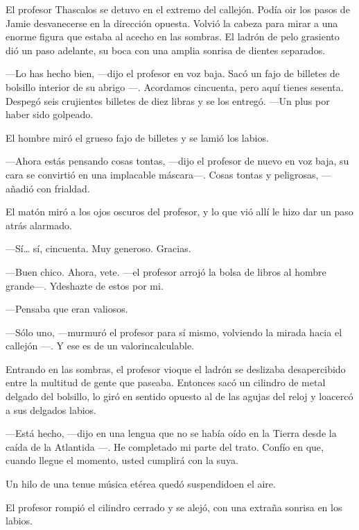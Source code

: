El profesor Thascalos se detuvo en el extremo del callejón.
Podía oir los pasos de Jamie desvanecerse en la dirección opuesta.
Volvió la cabeza para mirar a una enorme figura que estaba al acecho en
las sombras. El ladrón de pelo grasiento dió un paso adelante, su boca
con una amplia sonrisa de dientes separados.

---Lo has hecho bien, ---dijo el profesor en voz baja. Sacó un
fajo de billetes de bolsillo interior de su abrigo ---. Acordamos
cincuenta, pero aquí tienes sesenta. Despegó seis crujientes billetes de
diez libras y se los entregó. ---Un plus por haber sido golpeado.

El hombre miró el grueso fajo de billetes y se lamió los labios.

---Ahora estás pensando cosas tontas, ---dijo el profesor de
nuevo en voz baja, su cara se convirtió en una implacable máscara---.
Cosas tontas y peligrosas, --- añadió con frialdad.

El matón miró a los ojos oscuros del profesor, y lo que vió allí
le hizo dar un paso atrás alarmado.

---Sí\ldots{} sí, cincuenta. Muy generoso. Gracias.

---Buen chico. Ahora, vete. ---el profesor arrojó la bolsa de
libros al hombre grande---. Ydeshazte de estos por mi.

---Pensaba que eran valiosos.

---Sólo uno, ---murmuró el profesor para sí mismo, volviendo la
mirada hacia el callejón ---. Y ese es de un valorincalculable.

Entrando en las sombras, el profesor vioque el ladrón se
deslizaba desapercibido entre la multitud de gente que paseaba. Entonces
sacó un cilindro de metal delgado del bolsillo, lo giró en sentido
opuesto al de las agujas del reloj y loacercó a sus delgados labios.

---Está hecho, ---dijo en una lengua que no se había oído en la
Tierra desde la caída de la Atlantida ---. He completado mi parte del
trato. Confío en que, cuando llegue el momento, usted cumplirá con la
suya.

Un hilo de una tenue música etérea quedó suspendidoen el aire.

El profesor rompió el cilindro cerrado y se alejó, con una
extraña sonrisa en los labios.